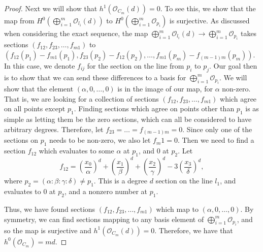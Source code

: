 \begin{proof}
    Next we will show that $h^1(\mathcal{O}_{C_m}(d)) = 0$. To see this, we show that the map from $H^0(\bigoplus_{i=1}^m \mathcal{O}_{l_i}(d))$ to $H^0(\bigoplus_{i=1}^m \mathcal{O}_{p_i})$ is surjective. As discussed when considering the exact sequence, the map $\bigoplus_{i=1}^m \mathcal{O}_{l_i}(d) \to \bigoplus_{i=1}^m \mathcal{O}_{p_i}$ takes sections $(f_{12}, f_{23}, \dots, f_{m1})$ to $(f_{12}(p_1) - f_{m1}(p_1), f_{23}(p_2) - f_{12}(p_2), \dots, f_{m1}(p_m) - f_{(m-1)m}(p_m))$. In this case, we denote $f_{ij}$ for the section on the line from $p_i$ to $p_j$. Our goal then is to show that we can send these differences to a basis for $\bigoplus_{i=1}^m \mathcal{O}_{p_i}$. We will show that the element $(\alpha,0, \dots, 0)$ is in the image of our map, for $\alpha$ non-zero. That is, we are looking for a collection of sections $(f_{12}, f_{23}, \dots, f_{m1})$ which agree on all points except $p_1$. Finding sections which agree on points other than $p_1$ is as simple as letting them be the zero sections, which can all be considered to have arbitrary degrees. Therefore, let $f_{23} = \dots = f_{(m-1)m} = 0$. Since only one of the sections on $p_1$ needs to be non-zero, we also let $f_m1= 0 $. Then we need to find a section $f_{12}$ which evaluates to some $\alpha$ at $p_1$, and 0 at $p_2$. Let
    \[
        f_{12} = (\frac{x_0}{\alpha})^d + (\frac{x_1}{\beta})^d + (\frac{x_2}{\gamma})^d - 3(\frac{x_3}{\delta})^d,
    \]
    where $p_2 = (\alpha : \beta : \gamma : \delta) \neq p_1$. This is a degree $d$ section on the line $l_1$, and evaluates to 0 at $p_2$, and a nonzero number at $p_1$. 
    
    Thus, we have found sections $(f_{12}, f_{23}, \dots, f_{m1})$ which map to $(\alpha,0,\dots,0)$. By symmetry, we can find sections mapping to any basis element of $\bigoplus_{i=1}^m \mathcal{O}_{p_i}$, and so the map is surjective and $h^1(\mathcal{O}_{C_m}(d)) = 0$. Therefore, we have that $h^0(\mathcal{O}_{C_m}) = md$.
    
\end{proof}

